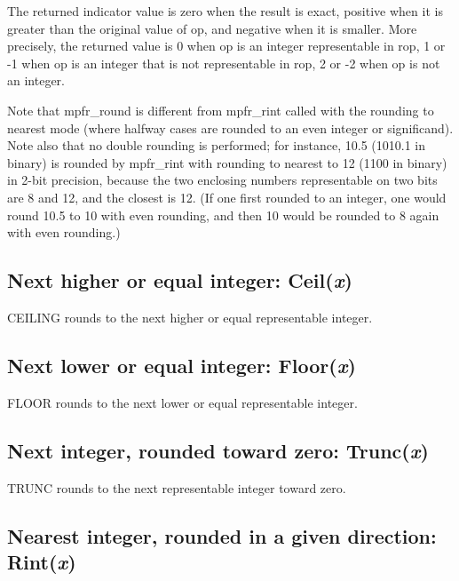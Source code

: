 The returned indicator value is zero when the result is exact, positive when it is greater than the
original value of op, and negative when it is smaller. More precisely, the returned value is
0 when op is an integer representable in rop, 1 or -1 when op is an integer that is not
representable in rop, 2 or -2 when op is not an integer.

Note that mpfr\_round is different from mpfr\_rint called with the rounding to nearest mode
(where halfway cases are rounded to an even integer or significand). Note also that no double
rounding is performed; for instance, 10.5 (1010.1 in binary) is rounded by mpfr\_rint with
rounding to nearest to 12 (1100 in binary) in 2-bit precision, because the two enclosing
numbers representable on two bits are 8 and 12, and the closest is 12. (If one first rounded
to an integer, one would round 10.5 to 10 with even rounding, and then 10 would be rounded
to 8 again with even rounding.)


\subsection{Next higher or equal integer: Ceil(\textit{x})}


\vspace{0.3cm}
CEILING rounds to the next higher or equal representable integer.




\subsection{Next lower or equal integer: Floor(\textit{x})}


\vspace{0.3cm}

FLOOR rounds to the next lower or equal representable integer.



\subsection{Next integer, rounded toward zero: Trunc(\textit{x})}


TRUNC rounds to the next representable integer toward zero.



\subsection{Nearest integer, rounded  in a given direction: Rint(\textit{x})}

